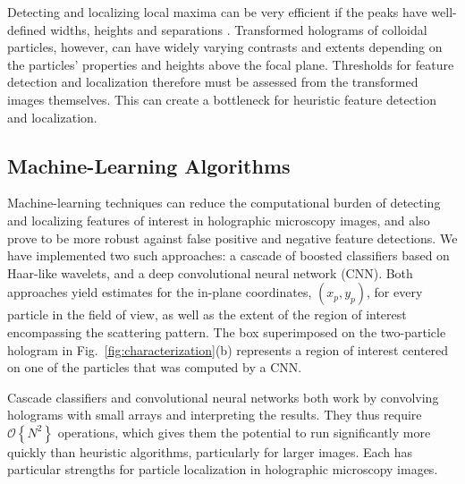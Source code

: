 \documentclass[10pt,letterpaper]{article}
\newcommand{\order}[1]{\mathcal{O}\!\left\{ #1 \right\}}
\begin{document}
Detecting and localizing local maxima can be very
efficient if the peaks have well-defined widths,
heights and separations \cite{crocker96,allan16trackpy}.
Transformed holograms of colloidal particles, however,
can have widely varying contrasts
and extents depending on the particles' properties and
heights above the focal plane.
Thresholds for feature detection and localization therefore
must be assessed from the transformed images
themselves.
This can create a bottleneck
for
heuristic feature detection and localization.

\subsection{Machine-Learning Algorithms}

Machine-learning techniques can reduce the computational
burden of detecting and localizing features of interest in
holographic microscopy images, and also prove to be more
robust against false positive and negative feature detections.
We have implemented two such approaches:
a cascade of boosted classifiers based on Haar-like wavelets,
and a deep convolutional neural network (CNN).
Both approaches yield estimates for the in-plane
coordinates, $(x_p, y_p)$, for every particle in the field
of view, as well as the extent of the region of interest
encompassing the scattering pattern.
The box superimposed on the two-particle hologram in
Fig.~\ref{fig:characterization}(b) represents a
region of interest centered on one of the particles
that was computed by a CNN.

Cascade classifiers and convolutional neural networks
both work by convolving holograms with
small arrays and interpreting the results.
They thus require $\order{N^2}$ operations, which
gives them the potential to run significantly more
quickly than heuristic algorithms, particularly for
larger images.
Each has particular strengths for particle localization
in holographic microscopy images.
\end{document}
